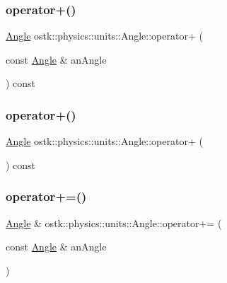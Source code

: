\mbox{\label{classostk_1_1physics_1_1units_1_1_angle_acbc8a13c8f84ed77a741538aa1d8ce91}} 
\subsubsection{\texorpdfstring{operator+()}{operator+()}\hspace{0.1cm}{\footnotesize\ttfamily [1/2]}}
{\footnotesize\ttfamily \hyperlink{classostk_1_1physics_1_1units_1_1_angle}{Angle} ostk\+::physics\+::units\+::\+Angle\+::operator+ (\begin{DoxyParamCaption}\item[{const \hyperlink{classostk_1_1physics_1_1units_1_1_angle}{Angle} \&}]{an\+Angle }\end{DoxyParamCaption}) const}

\mbox{\label{classostk_1_1physics_1_1units_1_1_angle_a99e2fafc9060fa99b1fb4623f6ed8f65}} 
\subsubsection{\texorpdfstring{operator+()}{operator+()}\hspace{0.1cm}{\footnotesize\ttfamily [2/2]}}
{\footnotesize\ttfamily \hyperlink{classostk_1_1physics_1_1units_1_1_angle}{Angle} ostk\+::physics\+::units\+::\+Angle\+::operator+ (\begin{DoxyParamCaption}{ }\end{DoxyParamCaption}) const}

\mbox{\label{classostk_1_1physics_1_1units_1_1_angle_a814933d09dc8cb6cb4a7a013386c2267}} 
\subsubsection{\texorpdfstring{operator+=()}{operator+=()}}
{\footnotesize\ttfamily \hyperlink{classostk_1_1physics_1_1units_1_1_angle}{Angle} \& ostk\+::physics\+::units\+::\+Angle\+::operator+= (\begin{DoxyParamCaption}\item[{const \hyperlink{classostk_1_1physics_1_1units_1_1_angle}{Angle} \&}]{an\+Angle }\end{DoxyParamCaption})}

